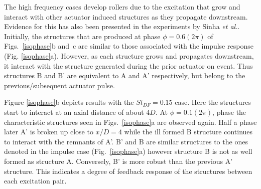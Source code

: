 \documentclass[english]{aiaa-tc}
\begin{document}
The high frequency cases develop rollers due to the excitation that
grow and interact with other actuator induced structures as they
propagate downstream. Evidence for this has also been presented in the
experiments by Sinha {\em et al.}\cite{sinha2013}. Initially, the structures that
are produced at phase $\phi=0.6(2\pi)$ of Figs.~\ref{isophase}b and~c
are similar to those associated with the impulse response (Fig.
\ref{isophase}a).  However, as each structure grows and propagates downstream,
it interact with the structure generated during the prior actuator on event.
Thus structures B and B' are equivalent to A and A' respectively, but belong
to the previous/subsequent actuator pulse.

Figure \ref{isophase}b depicts results with the $St_{DF}=0.15$ case.
Here the structures start to interact at an axial distance of about
$4D$. At $\phi=0.1(2\pi)$, phase the characteristic structures seen in
Figs.~\ref{isophase}a are observed again. Half a phase later A' is
broken up close to $x/D=4$ while the ill formed B structure continues
to interact with the remnants of A'. B' and B are similar structures
to the ones denoted in the impulse case (Fig.~\ref{isophase}a) however
structure B is not as well formed as structure A. Conversely, B' is
more robust than the previous A' structure. This indicates a degree of
feedback response of the structures between each excitation pair.
\end{document}
